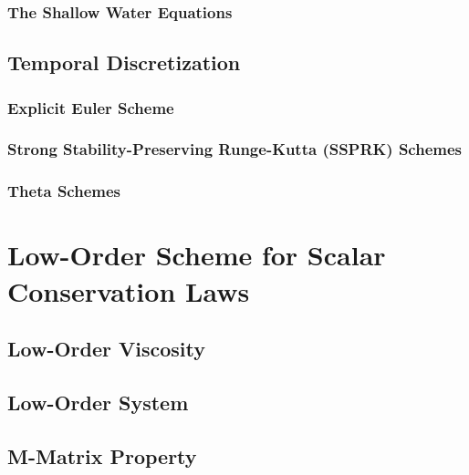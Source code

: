   \subsubsection{The Shallow Water Equations
    \label{sec:spatial_discretization_shallowwater}}
    
\subsection{Temporal Discretization\label{sec:temporal_discretization}}
  \subsubsection{Explicit Euler Scheme\label{sec:explicit_euler}}
    
  \subsubsection{Strong Stability-Preserving Runge-Kutta (SSPRK)
    Schemes\label{sec:ssprk}}
    
  \subsubsection{Theta Schemes\label{sec:theta}}
    
\section{Low-Order Scheme for Scalar Conservation Laws}\label{sec:low_order_scalar}

\subsection{Low-Order Viscosity\label{sec:low_order_viscosity_scalar}}
  
\subsection{Low-Order System\label{sec:low_order_scheme_scalar}}
  
\subsection{M-Matrix Property\label{sec:m_matrix}}
  
